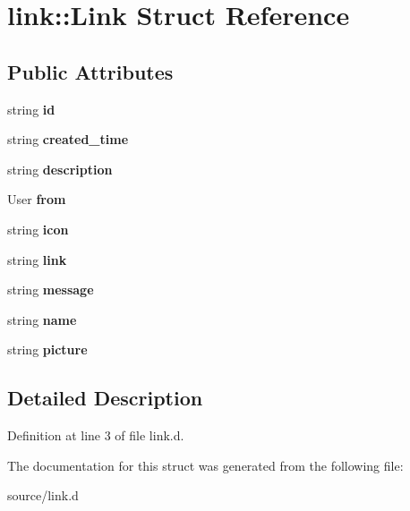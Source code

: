 \hypertarget{structlink_1_1Link}{}\section{link\+:\+:Link Struct Reference}
\label{structlink_1_1Link}
\subsection*{Public Attributes}
\begin{DoxyCompactItemize}
\item 
\mbox{\label{structlink_1_1Link_a35d809fc4e6640fb4eeea74db780985d}} 
string {\bfseries id}
\item 
\mbox{\label{structlink_1_1Link_a5e2c852d064c31589b8d450e34f55762}} 
string {\bfseries created\+\_\+time}
\item 
\mbox{\label{structlink_1_1Link_a21529a0f8e5cf20a3d41b1bc8e9bcc6d}} 
string {\bfseries description}
\item 
\mbox{\label{structlink_1_1Link_af358a37c7b2487be48befd9902523e2e}} 
User {\bfseries from}
\item 
\mbox{\label{structlink_1_1Link_a3f6deef22f687fa9bf16429e2a4ff8ef}} 
string {\bfseries icon}
\item 
\mbox{\label{structlink_1_1Link_a685521716e1c70e478f173f0c34bb92b}} 
string {\bfseries link}
\item 
\mbox{\label{structlink_1_1Link_ab35d8fe4cf111036a564719f69f565bb}} 
string {\bfseries message}
\item 
\mbox{\label{structlink_1_1Link_a461100dd85bd909bfd76b5901858996a}} 
string {\bfseries name}
\item 
\mbox{\label{structlink_1_1Link_ab6021020b07c54f0b29fe24586f44353}} 
string {\bfseries picture}
\end{DoxyCompactItemize}


\subsection{Detailed Description}


Definition at line 3 of file link.\+d.



The documentation for this struct was generated from the following file\+:\begin{DoxyCompactItemize}
\item 
source/link.\+d\end{DoxyCompactItemize}
